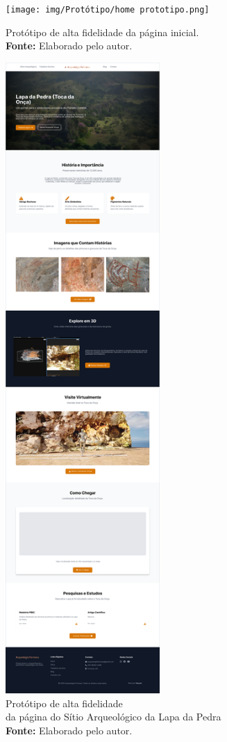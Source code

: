 \begin{figure}[H]
    \centering
    \begin{minipage}[b]{0.48\textwidth}
        \centering
        \texttt{[image: img/Protótipo/home prototipo.png]}
        \caption{Protótipo de alta fidelidade da página inicial. \\
            \textbf{Fonte:} Elaborado pelo autor.}
        \label{fig:prototipo_home}
    \end{minipage}
    \hfill
    \begin{minipage}[b]{0.48\textwidth}
        \centering
        \includegraphics[height=24cm, keepaspectratio]{img/Protótipo/prototipo alta fidelidade toca da onça.png}
        \caption{Protótipo de alta fidelidade \\da página do Sítio Arqueológico da Lapa da Pedra \\
            \textbf{Fonte:} Elaborado pelo autor.}
        \label{fig:prototipo_lapadapedra}
    \end{minipage}
\end{figure}

